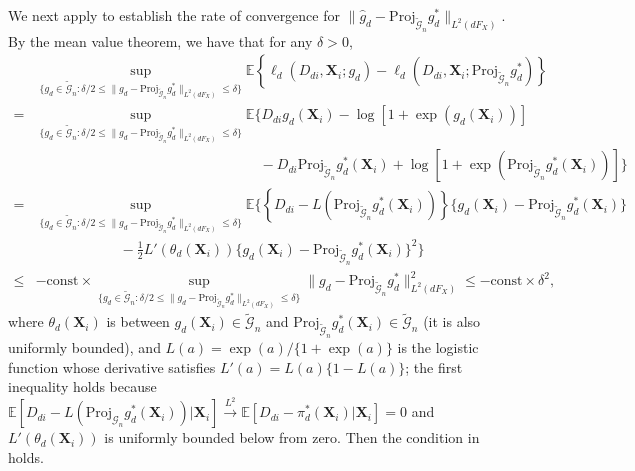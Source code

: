 \documentclass[11pt]{article}
\def\bs{\boldsymbol}
\numberwithin{equation}{section}
\begin{document}
We next apply \citet[Theorem 3.4.1]{van1996weak} to establish the rate of convergence for $\|\widehat{g}_d-\text{Proj}_{\widetilde{\mathcal{G}}_n}g_d^*\|_{L^2(dF_X)}$.  By the mean value theorem, we have that for any $\delta>0$,
\begin{align*}
	&\sup_{\{g_d\in\widetilde{\mathcal{G}}_n:\delta/2\leq \|g_d-\text{Proj}_{\widetilde{\mathcal{G}}_n}g_d^*\|_{L^2(dF_X)}\leq\delta\}}\mathbb{E}\left\{\ell_d(D_{di},\boldsymbol{X}_{i};g_d)-\ell_d(D_{di},\boldsymbol{X}_{i};\text{Proj}_{\widetilde{\mathcal{G}}_n}g_d^*)\right\}\\
	=&\sup_{\{g_d\in\widetilde{\mathcal{G}}_n:\delta/2\leq \|g_d-\text{Proj}_{\widetilde{\mathcal{G}}_n}g_d^*\|_{L^2(dF_X)}\leq\delta\}}\mathbb{E}\bigg\{D_{di}g_d(\boldsymbol{X}_i)-\log\left[1+\exp(g_d(\boldsymbol{X}_i))\right]\\
	&\qquad\qquad\qquad\qquad\qquad\qquad\qquad\qquad-D_{di}\text{Proj}_{\widetilde{\mathcal{G}}_n}g_d^*(\bs{X}_i)+\log\left[1+\exp(\text{Proj}_{\widetilde{\mathcal{G}}_n}g_d^*(\bs{X}_i))\right]\bigg\}\\
	= &\sup_{\{g_d\in\widetilde{\mathcal{G}}_n:\delta/2\leq \|g_d-\text{Proj}_{\widetilde{\mathcal{G}}_n}g_d^*\|_{L^2(dF_X)}\leq\delta\}}\mathbb{E}\bigg\{\left\{D_{di}-L(\text{Proj}_{\widetilde{\mathcal{G}}_n}g_d^*(\bs{X}_i))\right\}\{g_d(\boldsymbol{X}_i)-\text{Proj}_{\widetilde{\mathcal{G}}_n}g_d^*(\bs{X}_i)\}\\
	&\qquad\qquad\qquad-\frac{1}{2}L'\left(\theta_d(\bs{X}_i)\right)\{g_d(\boldsymbol{X}_i)-\text{Proj}_{\widetilde{\mathcal{G}}_n}g_d^*(\bs{X}_i)\}^2\bigg\}\\
	\leq  & -\text{const}\times \sup_{\{g_d\in\widetilde{\mathcal{G}}_n:\delta/2\leq \|g_d-\text{Proj}_{\widetilde{\mathcal{G}}_n}g_d^*\|_{L^2(dF_X)}\leq\delta\}}\|g_d-\text{Proj}_{\widetilde{\mathcal{G}}_n}g_d^*\|^2_{L^2(dF_X)}\leq  -\text{const}\times \delta^2,
\end{align*}
where $\theta_d(\bs{X}_i)$ is between $g_d(\boldsymbol{X}_i)\in \widetilde{\mathcal{G}}_n$ and $\text{Proj}_{\widetilde{\mathcal{G}}_n}g_d^*(\bs{X}_i)\in \widetilde{\mathcal{G}}_n$ (it is also uniformly bounded), and  $L(a)=\exp(a)/\{1+\exp(a)\}$ is the logistic function whose derivative satisfies $L'(a)=L(a)\{1-L(a)\}$; the first inequality holds because $\mathbb{E}[D_{di}-L(\text{Proj}_{\mathcal{G}_n}g_d^*(\bs{X}_i))|\bs{X}_i]\xrightarrow{L^2} \mathbb{E}[D_{di}-\pi_d^*(\bs{X}_i)|\bs{X}_i]=0$  and $L'\left(\theta_d(\bs{X}_i)\right)$ is uniformly bounded below from zero. Then the condition in  \citet[Theorem 3.4.1]{van1996weak} holds.
\end{document}
